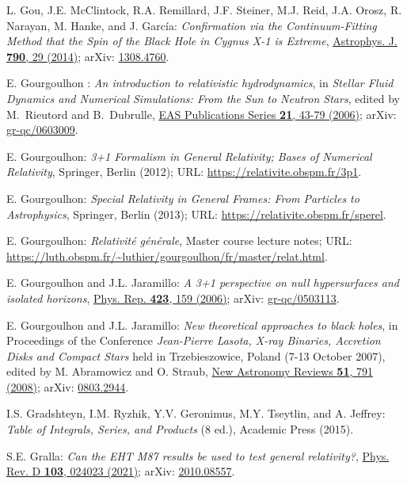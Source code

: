 \begin{thebibliography}{123}
L. Gou, J.E. McClintock, R.A. Remillard, J.F. Steiner, M.J. Reid, J.A. Orosz, R. Narayan, M. Hanke, and J. García:
{\em Confirmation via the Continuum-Fitting Method that the Spin of the Black Hole in Cygnus X-1 is Extreme},
\href{https://doi.org/10.1088/0004-637X/790/1/29}{Astrophys. J. {\bf 790}, 29 (2014)};
arXiv: \href{https://arxiv.org/abs/1308.4760}{1308.4760}.

E. Gourgoulhon :
{\em  An introduction to relativistic hydrodynamics},
in {\em Stellar Fluid Dynamics and Numerical Simulations: From the Sun
to Neutron Stars}, edited by M.~Rieutord and B.~Dubrulle,
\href{https://doi.org/10.1051/eas:2006106}{EAS Publications Series {\bf 21}, 43-79 (2006)};
arXiv: \href{https://arxiv.org/abs/gr-qc/0603009}{gr-qc/0603009}.

E. Gourgoulhon:
{\em 3+1 Formalism in General Relativity; Bases of Numerical Relativity},
Springer, Berlin (2012);
URL: \url{https://relativite.obspm.fr/3p1}.

E. Gourgoulhon:
{\em Special Relativity in General Frames: From Particles to Astrophysics},
Springer, Berlin (2013);
URL: \url{https://relativite.obspm.fr/sperel}.

E. Gourgoulhon:
{\em Relativité générale},
Master course lecture notes;
URL: \url{https://luth.obspm.fr/~luthier/gourgoulhon/fr/master/relat.html}.

E. Gourgoulhon and J.L. Jaramillo:
{\em A 3+1 perspective on null hypersurfaces and isolated horizons},
\href{https://doi.org/10.1016/j.physrep.2005.10.005}{Phys. Rep. {\bf 423}, 159 (2006)};
arXiv: \href{https://arxiv.org/abs/gr-qc/0503113}{gr-qc/0503113}.

E. Gourgoulhon and J.L. Jaramillo:
{\em New theoretical approaches to black holes},
in Proceedings of the Conference {\em Jean-Pierre Lasota, X-ray Binaries, Accretion Disks and Compact Stars} held in Trzebieszowice, Poland (7-13 October 2007), edited by M. Abramowicz and O. Straub, \href{https://doi.org/10.1016/j.newar.2008.03.026}{New Astronomy Reviews {\bf 51}, 791 (2008)};
arXiv: \href{https://arxiv.org/abs/0803.2944}{0803.2944}.

I.S. Gradshteyn, I.M. Ryzhik, Y.V. Geronimus, M.Y. Tseytlin, and A. Jeffrey:
{\em  Table of Integrals, Series, and Products} (8 ed.),
Academic Press (2015).

S.E. Gralla:
{\em Can the EHT M87 results be used to test general relativity?},
\href{https://doi.org/10.1103/PhysRevD.103.024023}{Phys. Rev. D {\bf 103}, 024023 (2021)};
arXiv: \href{https://arxiv.org/abs/2010.08557}{2010.08557}.


\end{thebibliography}
